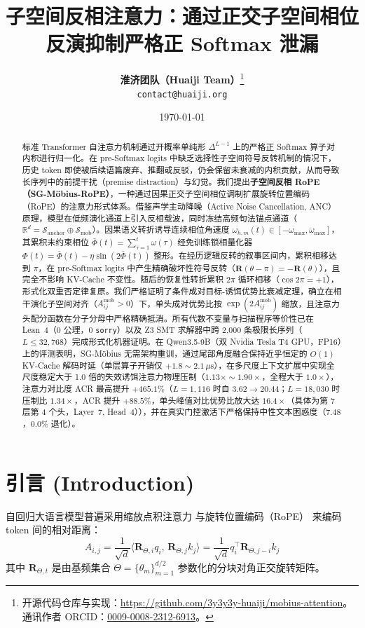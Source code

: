 \documentclass[11pt,a4paper]{article}
\title{\textbf{子空间反相注意力：通过正交子空间相位反演抑制严格正 Softmax 泄漏}}
\author{
  \textbf{淮济团队（Huaiji Team）}\thanks{开源代码仓库与实现：\url{https://github.com/3y3y3y-huaiji/mobius-attention}。通讯作者 ORCID：\href{https://orcid.org/0009-0008-2312-6913}{0009-0008-2312-6913}。} \\
  \texttt{contact@huaiji.org}
}
\date{\today}
\theoremstyle{definition}
\begin{document}
\maketitle

\begin{abstract}
标准 Transformer 自注意力机制通过开概率单纯形 $\Delta^{L-1}$ 上的严格正 Softmax 算子对内积进行归一化。在 pre-Softmax logits 中缺乏选择性子空间符号反转机制的情况下，历史 token 即使被后续语篇废弃、推翻或反驳，仍会保留未衰减的内积贡献，从而导致长序列中的前提干扰（premise distraction）与幻觉。我们提出\textbf{子空间反相 RoPE（SG-M\"obius-RoPE）}，一种通过因果正交子空间相位调制扩展旋转位置编码（RoPE）的注意力形式体系。借鉴声学主动降噪（Active Noise Cancellation, ANC）原理，模型在低频演化通道上引入反相载波，同时冻结高频句法锚点通道（$\mathbb{R}^d = \mathcal{S}_{\text{anchor}} \oplus \mathcal{S}_{\text{mob}}$）。因果语义转折诱导连续相位角速度 $\omega_{h,m}(t) \in [-\omega_{\max}, \omega_{\max}]$，其累积未约束相位 $\bar{\Phi}(t) = \sum_{\tau=1}^t \omega(\tau)$ 经免训练锁相量化器 $\Phi(t) = \bar{\Phi}(t) - \eta\sin(2\bar{\Phi}(t))$ 整形。在经历逻辑反转的叙事区间内，累积相移达到 $\pi$，在 pre-Softmax logits 中产生精确破坏性符号反转（$\mathbf{R}(\theta - \pi) = -\mathbf{R}(\theta)$），且完全不影响 KV-Cache 不变性。随后的恢复性转折累积 $2\pi$ 循环相移（$\cos 2\pi = +1$），形式化双重否定律复原。我们严格证明了条件成对目标-诱饵优势比衰减定理，确立在相干演化子空间对齐（$A_{ij}^{\text{mob}} > 0$）下，单头成对优势比按 $\exp(2A_{ij}^{\text{mob}})$ 缩放，且注意力头配分函数在分子分母中严格精确抵消。所有代数不变量与扫描程序等价性已在 Lean~4（0 公理，0 \texttt{sorry}）以及 Z3 SMT 求解器中跨 2,000 条极限长序列（$L \le 32,768$）完成形式化机器证明。在 Qwen3.5-9B（双 Nvidia Tesla T4 GPU，FP16）上的评测表明，SG-M\"obius 无需架构重训，通过尾部角度融合保持近乎恒定的 $O(1)$ KV-Cache 解码时延（单层算子开销仅 $+1.8\sim 2.1\,\mu\text{s}$），在多尺度上下文扩展中实现全尺度稳定大于 1.0 倍的失效诱饵注意力物理压制（$1.13\times\sim 1.90\times$，全程大于 $1.0\times$），注意力对比度 ACR 最高提升 $+465.1\%$（$L=1,116$ 时自 $3.62\to 20.44$；$L=18,030$ 时压制比 $1.34\times$，ACR 提升 $+88.5\%$，单头峰值对比优势比放大达 $16.4\times$（具体为第 7 层第 4 个头，Layer~7, Head~4）），并在真实门控激活下严格保持中性文本困惑度（$7.48$，$0.0\%$ 退化）。
\end{abstract}

\section{引言 (Introduction)}
自回归大语言模型普遍采用缩放点积注意力 \cite{vaswani2017attention} 与旋转位置编码（RoPE）\cite{su2024roformer} 来编码 token 间的相对距离：
\begin{equation}
A_{i,j} = \frac{1}{\sqrt{d}} \langle \mathbf{R}_{\Theta, i} q_i, \, \mathbf{R}_{\Theta, j} k_j \rangle = \frac{1}{\sqrt{d}} q_i^\top \mathbf{R}_{\Theta, j-i} k_j
\end{equation}
其中 $\mathbf{R}_{\Theta, t}$ 是由基频集合 $\Theta = \{\theta_m\}_{m=1}^{d/2}$ 参数化的分块对角正交旋转矩阵。
\end{document}
